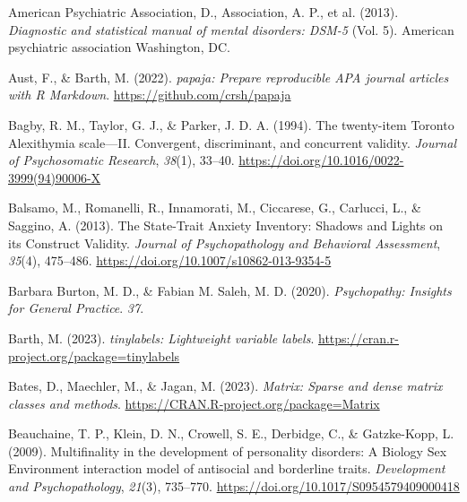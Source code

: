 \documentclass[
  man,floatsintext]{apa7}
\newlength{\cslhangindent}
\newlength{\cslentryspacingunit} %
\newenvironment{CSLReferences}[2] %
 {%
  \setlength{\parindent}{0pt}
  \ifodd #1
  \let\oldpar\par
  \def\par{\hangindent=\cslhangindent\oldpar}
  \fi
  \setlength{\parskip}{#2\cslentryspacingunit}
 }%
 {}
\begin{document}
\hypertarget{refs}{}
\begin{CSLReferences}{1}{0}
\leavevmode{}%
American Psychiatric Association, D., Association, A. P., et al. (2013). \emph{Diagnostic and statistical manual of mental disorders: DSM-5} (Vol. 5). American psychiatric association Washington, DC.

\leavevmode{}%
Aust, F., \& Barth, M. (2022). \emph{{papaja}: {Prepare} reproducible {APA} journal articles with {R Markdown}}. \url{https://github.com/crsh/papaja}

\leavevmode{}%
Bagby, R. M., Taylor, G. J., \& Parker, J. D. A. (1994). The twenty-item {Toronto Alexithymia} scale---{II}. {Convergent}, discriminant, and concurrent validity. \emph{Journal of Psychosomatic Research}, \emph{38}(1), 33--40. \url{https://doi.org/10.1016/0022-3999(94)90006-X}

\leavevmode{}%
Balsamo, M., Romanelli, R., Innamorati, M., Ciccarese, G., Carlucci, L., \& Saggino, A. (2013). The {State-Trait Anxiety Inventory}: {Shadows} and {Lights} on its {Construct Validity}. \emph{Journal of Psychopathology and Behavioral Assessment}, \emph{35}(4), 475--486. \url{https://doi.org/10.1007/s10862-013-9354-5}

\leavevmode{}%
Barbara Burton, M. D., \& Fabian M. Saleh, M. D. (2020). \emph{Psychopathy: {Insights} for {General Practice}}. \emph{37}.

\leavevmode{}%
Barth, M. (2023). \emph{{tinylabels}: Lightweight variable labels}. \url{https://cran.r-project.org/package=tinylabels}

\leavevmode{}%
Bates, D., Maechler, M., \& Jagan, M. (2023). \emph{Matrix: Sparse and dense matrix classes and methods}. \url{https://CRAN.R-project.org/package=Matrix}

\leavevmode{}%
Beauchaine, T. P., Klein, D. N., Crowell, S. E., Derbidge, C., \& Gatzke-Kopp, L. (2009). Multifinality in the development of personality disorders: {A Biology} {\texttimes} {Sex} {\texttimes} {Environment} interaction model of antisocial and borderline traits. \emph{Development and Psychopathology}, \emph{21}(3), 735--770. \url{https://doi.org/10.1017/S0954579409000418}


\end{CSLReferences}
\end{document}

